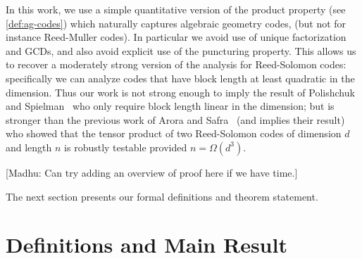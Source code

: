 \documentclass[11pt]{article}
\newcommand{\mnote}[1]{{\color{teal} [Madhu: #1]}}
\newcommand{\mnote}[1]{}
\begin{document}
In this work, we use a simple quantitative version of the product property (see \cref{def:ag-codes}) which naturally captures algebraic geometry codes, (but not for instance Reed-Muller codes). In particular we avoid use of unique factorization and GCDs, and also avoid explicit use of the puncturing property. This allows us to recover a moderately strong version of the analysis for Reed-Solomon codes: specifically we can analyze codes that have block length at least quadratic in the dimension. Thus our work is not strong enough to imply the result of Polishchuk and Spielman~\cite{PolSpi} who only require block length linear in the dimension; but is stronger than the previous work of Arora and Safra~\cite{AroSaf} (and implies their result) who showed that the tensor product of two Reed-Solomon codes of dimension $d$ and length $n$ is robustly testable provided $n = \Omega(d^3)$. 

\mnote{Can try adding an overview of proof here if we have time.}

The next section presents our formal definitions and theorem statement.

\section{Definitions and Main Result}
\end{document}
